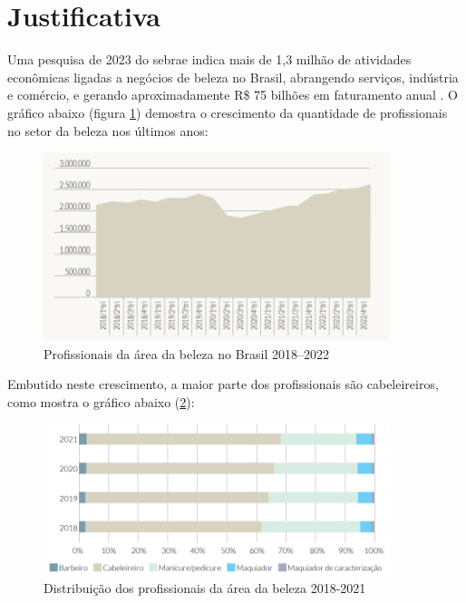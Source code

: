 \section{Justificativa}

Uma pesquisa de 2023 do \gls{sebrae} indica mais de 1,3 milhão de atividades econômicas ligadas a negócios de beleza no Brasil, abrangendo serviços, indústria e comércio, e gerando aproximadamente R\$ 75 bilhões em faturamento anual \cite{sebrae2023forca}. O gráfico abaixo (figura \ref{fig:profissionais_brasil}) demostra o crescimento da quantidade de profissionais no setor da beleza nos últimos anos:

 \begin{figure}[htb]
 	\centering
 	\includegraphics[width=0.9\textwidth]{cap01-Introducao/Images/1.3_grafico_profissionais_brasil}
 	\caption{Profissionais da área da beleza no Brasil 2018–2022}
 	\label{fig:profissionais_brasil}
 \end{figure}
 
 \FloatBarrier
 
Embutido neste crescimento, a maior parte dos profissionais são cabeleireiros, como mostra o gráfico abaixo (\ref{fig:Distribuição_profissionais}):

\begin{figure}[htb]
	\centering
	\includegraphics[width=0.9\textwidth]{cap01-Introducao/Images/1.3_grafico_maioria_cabeleireiros}
	\caption{Distribuição dos profissionais da área da beleza 2018-2021}
	\label{fig:Distribuição_profissionais}
\end{figure}

